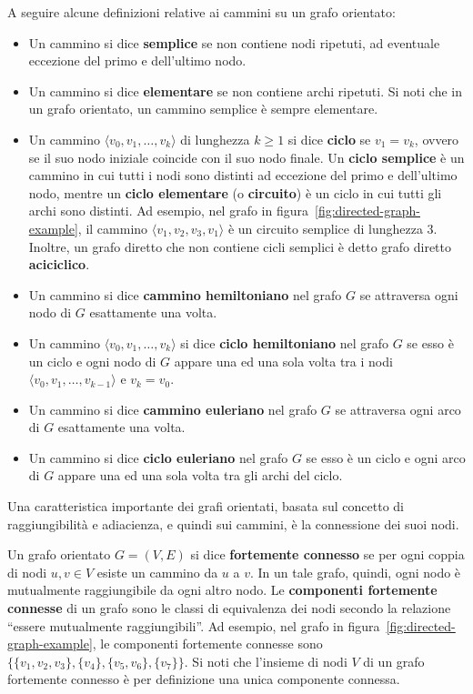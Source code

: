 A seguire alcune definizioni relative ai cammini su un grafo orientato:

\begin{itemize}
    \item Un cammino si dice \textbf{semplice} se non contiene nodi ripetuti, ad eventuale eccezione del primo e
    dell'ultimo nodo.
    \item Un cammino si dice \textbf{elementare} se non contiene archi ripetuti. Si noti che in un grafo orientato, un
    cammino semplice \`e sempre elementare.
    \item Un cammino $\langle v_0, v_1, \ldots, v_k \rangle$ di lunghezza $k \geq 1$ si dice \textbf{ciclo} se $v_1 = v_k$, ovvero se il
    suo nodo iniziale coincide con il suo nodo finale.
    Un \textbf{ciclo semplice} \`e un cammino in cui tutti i nodi sono distinti ad eccezione del primo e dell'ultimo
    nodo, mentre un \textbf{ciclo elementare} (o \textbf{circuito}) \`e un ciclo in cui tutti gli archi sono distinti.
    Ad esempio, nel grafo in figura~\ref{fig:directed-graph-example}, il cammino $\langle v_1, v_2, v_3, v_1 \rangle$
    \`e un circuito semplice di lunghezza 3.
    Inoltre, un grafo diretto che non contiene cicli semplici \`e detto grafo diretto \textbf{aciciclico}.
    \item Un cammino si dice \textbf{cammino hemiltoniano} nel grafo $G$ se attraversa ogni nodo di $G$ esattamente
    una volta.
    \item Un cammino $\langle v_0, v_1, \ldots, v_k \rangle$ si dice \textbf{ciclo hemiltoniano} nel grafo $G$ se
    esso \`e un ciclo e ogni nodo di $G$ appare una ed una sola volta tra i nodi $\langle v_0, v_1, \ldots,
    v_{k-1}\rangle$ e $v_k = v_0$.
    \item Un cammino si dice \textbf{cammino euleriano} nel grafo $G$ se attraversa ogni arco di $G$ esattamente una
    volta.
    \item Un cammino si dice \textbf{ciclo euleriano} nel grafo $G$ se esso \`e un ciclo e ogni arco di $G$ appare una
    ed una sola volta tra gli archi del ciclo.
\end{itemize}


Una caratteristica importante dei grafi orientati, basata sul concetto di raggiungibilit\`a e adiacienza, e quindi
sui cammini, \`e la connessione dei suoi nodi.
\newline

Un grafo orientato $G = (V, E)$ si dice \textbf{fortemente connesso} se per ogni coppia di nodi $u, v \in V$ esiste un
cammino da $u$ a $v$.
In un tale grafo, quindi, ogni nodo \`e mutualmente raggiungibile da ogni altro nodo. \newline
Le \textbf{componenti fortemente connesse} di un grafo sono le classi di equivalenza dei nodi secondo la relazione
``essere mutualmente raggiungibili''.
Ad esempio, nel grafo in figura~\ref{fig:directed-graph-example}, le componenti fortemente connesse sono
$\{\{v_1, v_2, v_3\}, \{v_4\}, \{v_5, v_6\}, \{v_7\}\}$.
Si noti che l'insieme di nodi $V$ di un grafo fortemente connesso \`e per definizione una unica componente connessa.
\newline

